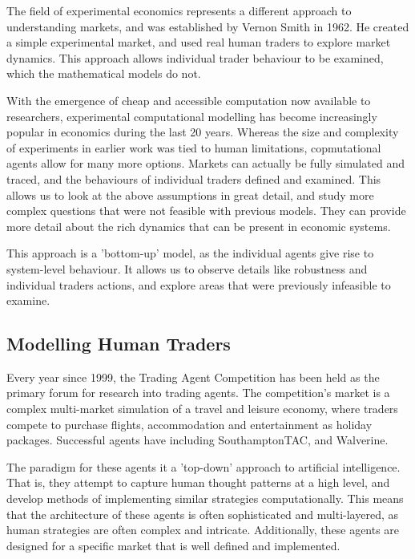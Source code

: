 The field of experimental economics represents a different approach to
understanding markets, and was established by Vernon Smith in
1962\cite{eco-smith62-competitive}. He created a simple experimental market,
and used real human traders to explore market dynamics. This approach allows
individual trader behaviour to be examined, which the mathematical models do
not.

With the emergence of cheap and accessible computation now available to
researchers, experimental computational modelling has become increasingly
popular in economics during the last 20 years. Whereas the size and complexity
of experiments in earlier work was tied to human limitations, copmutational
agents allow for many more options. Markets can actually be fully simulated and
traced, and the behaviours of individual traders defined and examined. This
allows us to look at the above assumptions in great detail, and study more
complex questions that were not feasible with previous models. They can provide
more detail about the rich dynamics that can be present in economic systems.  

This approach is a 'bottom-up' model, as the individual agents give rise to
system-level behaviour. It allows us to observe details like robustness and
individual traders actions, and explore areas that were previously infeasible to
examine.


\subsection{Modelling Human Traders}

Every year since 1999, the Trading Agent Competition\cite{eco-wellman99-tac}
has been held as the primary forum for research into trading agents.  The
competition's market is a complex multi-market simulation of a travel and
leisure economy, where traders compete to purchase flights, accommodation and
entertainment as holiday packages.  Successful agents have including
SouthamptonTAC\cite{eco-he05-tada}, and Walverine\cite{eco-cheng05-walverine}.

The paradigm for these agents it a 'top-down' approach to artificial
intelligence. That is, they attempt to capture human thought patterns at a high
level, and develop methods of implementing similar strategies computationally.
This means that the architecture of these agents is often sophisticated and
multi-layered, as human strategies are often complex and intricate.
Additionally, these agents are designed for a specific market that is well
defined and implemented.


